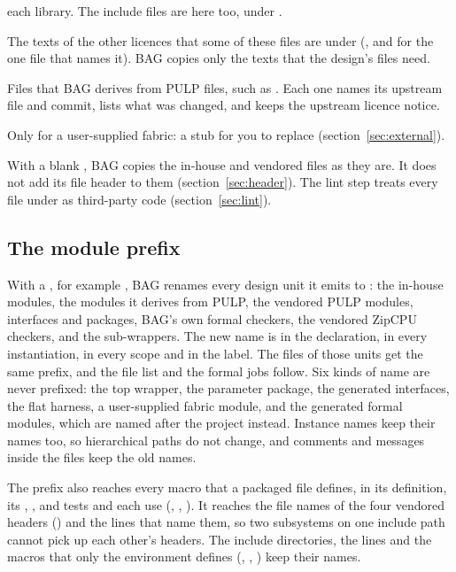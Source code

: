 \begin{description}
  each library. The include files are here too, under .
\item[\file{rtl/vendor/licences/}] The texts of the other licences that some of these
  files are under (, and  for the one file that
  names it). BAG copies only the texts that the design's files need.
\item[\file{rtl/vendor/derived/}] Files that BAG derives from PULP files, such as
  . Each one names its upstream file and commit, lists what was
  changed, and keeps the upstream licence notice.
\item[\file{rtl/ext/}] Only for a user-supplied fabric: a stub for you to replace
  (section~\ref{sec:external}).
\end{description}

With a blank , BAG copies the in-house and vendored files as they
are. It does not add its file header to them (section~\ref{sec:header}). The lint step treats every file under
 as third-party code (section~\ref{sec:lint}).

\subsection{The module prefix}
\label{sec:prefix}

With a , for example , BAG renames every design unit it
emits to : the in-house modules, the modules it derives from PULP, the
vendored PULP modules, interfaces and packages, BAG's own formal checkers, the vendored ZipCPU
checkers, and the sub-wrappers. The new name is in the declaration, in every instantiation, in
every  scope and in the  label. The files of those units get the
same prefix, and the file list and the formal jobs follow. Six kinds of name are never
prefixed: the top wrapper, the parameter package, the generated interfaces, the flat harness,
a user-supplied fabric module, and the generated formal modules, which are named after the
project instead. Instance names keep their names too, so hierarchical paths do not change,
and comments and messages inside the files keep the old names.

The prefix also reaches every macro that a packaged file defines, in its definition, its
, ,  and  tests and each use
(, , ). It
reaches the file names of the four vendored headers
() and the  lines that
name them, so two subsystems on one include path cannot pick up each other's headers. The
include directories, the  lines and the macros that only the environment
defines (, , ) keep their names.

